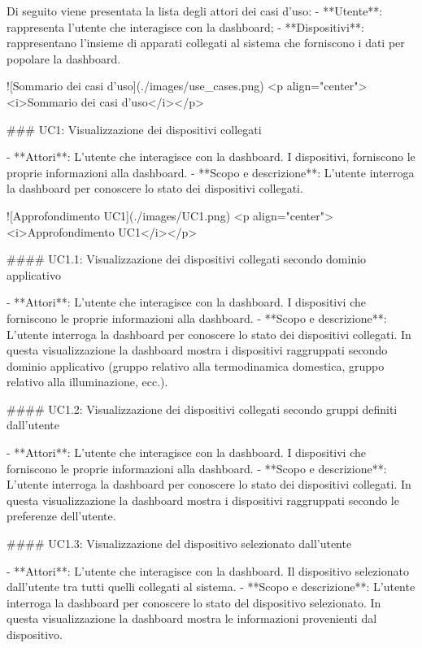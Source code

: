 Di seguito viene presentata la lista degli attori dei casi d’uso:
-   **Utente**: rappresenta l'utente che interagisce con la dashboard;
-   **Dispositivi**: rappresentano l'insieme di apparati collegati al sistema che forniscono i dati per popolare la dashboard.

![Sommario dei casi d'uso](./images/use_cases.png)
<p align="center"><i>Sommario dei casi d'uso</i></p>

### UC1: Visualizzazione dei dispositivi collegati

-   **Attori**:  
    L'utente che interagisce con la dashboard. I dispositivi, forniscono le proprie informazioni alla dashboard.
-   **Scopo e descrizione**:  
    L'utente interroga la dashboard per conoscere lo stato dei dispositivi collegati.


![Approfondimento UC1](./images/UC1.png)
<p align="center"><i>Approfondimento UC1</i></p>

#### UC1.1: Visualizzazione dei dispositivi collegati secondo dominio applicativo

-   **Attori**:  
    L'utente che interagisce con la dashboard. I dispositivi che forniscono le proprie informazioni alla dashboard.
-   **Scopo e descrizione**:  
    L'utente interroga la dashboard per conoscere lo stato dei dispositivi collegati. In questa visualizzazione la dashboard mostra i dispositivi raggruppati secondo dominio applicativo (gruppo relativo alla termodinamica domestica, gruppo relativo alla illuminazione, ecc.).


#### UC1.2: Visualizzazione dei dispositivi collegati secondo gruppi definiti dall'utente

-   **Attori**:  
    L'utente che interagisce con la dashboard. I dispositivi che forniscono le proprie informazioni alla dashboard.
-   **Scopo e descrizione**:  
    L'utente interroga la dashboard per conoscere lo stato dei dispositivi collegati. In questa visualizzazione la dashboard mostra i dispositivi raggruppati secondo le preferenze dell'utente.


#### UC1.3: Visualizzazione del dispositivo selezionato dall'utente

-   **Attori**:  
    L'utente che interagisce con la dashboard. Il dispositivo selezionato dall'utente tra tutti quelli collegati al sistema.
-   **Scopo e descrizione**:  
    L'utente interroga la dashboard per conoscere lo stato del dispositivo selezionato. In questa visualizzazione la dashboard mostra le informazioni provenienti dal dispositivo.

